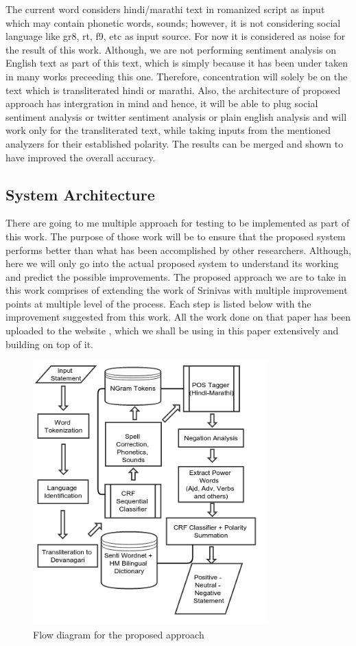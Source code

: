 \documentclass[conference]{IEEEtran}
\begin{document}
The current word considers hindi/marathi text in romanized script as input
which may contain phonetic words, sounds; however, it is not considering social
language like gr8, rt, f9, etc as input source. For now it is considered as
noise for the result of this work. Although, we are not performing sentiment
analysis on English text as part of this text, which is simply because it has
been under taken in many works preceeding this one. Therefore, concentration
will solely be on the text which is transliterated hindi or marathi. Also, the
architecture of proposed approach has intergration in mind and hence, it will
be able to plug social sentiment analysis or twitter sentiment analysis or
plain english analysis and will work only for the transliterated text, while
taking inputs from the mentioned analyzers for their established polarity. The
results can be merged and shown to have improved the overall accuracy. 


\subsection{System Architecture}

There are going to me multiple approach for testing to be implemented as part
of this work. The purpose of those work will be to ensure that the proposed
system performs better than what has been accomplished by other researchers.
Although, here we will only go into the actual proposed system to understand
its working and predict the possible improvements.
The proposed approach we are to take in this work comprises of extending the
work of Srinivas \cite{shashank_sharma_sentiment_????} with multiple
improvement points at multiple level of the process. Each step is listed below
with the improvement suggested from this work. All the work done on that paper
has been uploaded to the website \cite{_linguistic_????}, which we shall be
using in this paper extensively and building on top of it. 

\begin{figure}[ht!]
    \includegraphics[width=90mm]{polarity-pickup.png}
    \caption{Flow diagram for the proposed approach}
\end{figure}
\end{document}
